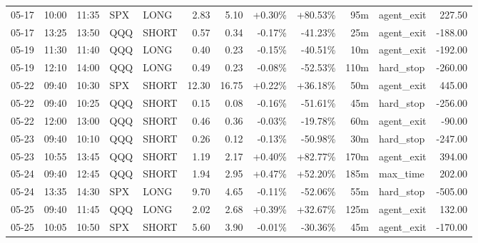 \documentclass[11pt,a4paper,twoside]{article}
\begin{document}
\begin{center}
\begin{longtable}{>{\color{txtmain}}l l l l l r r r r r >{\color{txtmain}}l r}
05-17 & 10:00 & 11:35 & SPX & LONG & 2.83 & 5.10 & \textcolor{wingreen}{+0.30\%} & \textcolor{wingreen}{+80.53\%} & 95m & agent\_exit & \textcolor{wingreen}{227.50} \\
05-17 & 13:25 & 13:50 & QQQ & SHORT & 0.57 & 0.34 & \textcolor{lossred}{-0.17\%} & \textcolor{lossred}{-41.23\%} & 25m & agent\_exit & \textcolor{lossred}{-188.00} \\
05-19 & 11:30 & 11:40 & QQQ & LONG & 0.40 & 0.23 & \textcolor{lossred}{-0.15\%} & \textcolor{lossred}{-40.51\%} & 10m & agent\_exit & \textcolor{lossred}{-192.00} \\
05-19 & 12:10 & 14:00 & QQQ & LONG & 0.49 & 0.23 & \textcolor{lossred}{-0.08\%} & \textcolor{lossred}{-52.53\%} & 110m & hard\_stop & \textcolor{lossred}{-260.00} \\
05-22 & 09:40 & 10:30 & SPX & SHORT & 12.30 & 16.75 & \textcolor{wingreen}{+0.22\%} & \textcolor{wingreen}{+36.18\%} & 50m & agent\_exit & \textcolor{wingreen}{445.00} \\
05-22 & 09:40 & 10:25 & QQQ & SHORT & 0.15 & 0.08 & \textcolor{lossred}{-0.16\%} & \textcolor{lossred}{-51.61\%} & 45m & hard\_stop & \textcolor{lossred}{-256.00} \\
05-22 & 12:00 & 13:00 & QQQ & SHORT & 0.46 & 0.36 & \textcolor{lossred}{-0.03\%} & \textcolor{lossred}{-19.78\%} & 60m & agent\_exit & \textcolor{lossred}{-90.00} \\
05-23 & 09:40 & 10:10 & QQQ & SHORT & 0.26 & 0.12 & \textcolor{lossred}{-0.13\%} & \textcolor{lossred}{-50.98\%} & 30m & hard\_stop & \textcolor{lossred}{-247.00} \\
05-23 & 10:55 & 13:45 & QQQ & SHORT & 1.19 & 2.17 & \textcolor{wingreen}{+0.40\%} & \textcolor{wingreen}{+82.77\%} & 170m & agent\_exit & \textcolor{wingreen}{394.00} \\
05-24 & 09:40 & 12:45 & QQQ & SHORT & 1.94 & 2.95 & \textcolor{wingreen}{+0.47\%} & \textcolor{wingreen}{+52.20\%} & 185m & max\_time & \textcolor{wingreen}{202.00} \\
05-24 & 13:35 & 14:30 & SPX & LONG & 9.70 & 4.65 & \textcolor{lossred}{-0.11\%} & \textcolor{lossred}{-52.06\%} & 55m & hard\_stop & \textcolor{lossred}{-505.00} \\
05-25 & 09:40 & 11:45 & QQQ & LONG & 2.02 & 2.68 & \textcolor{wingreen}{+0.39\%} & \textcolor{wingreen}{+32.67\%} & 125m & agent\_exit & \textcolor{wingreen}{132.00} \\
05-25 & 10:05 & 10:50 & SPX & SHORT & 5.60 & 3.90 & \textcolor{lossred}{-0.01\%} & \textcolor{lossred}{-30.36\%} & 45m & agent\_exit & \textcolor{lossred}{-170.00} \\

\end{longtable}
\end{center}
\end{document}
